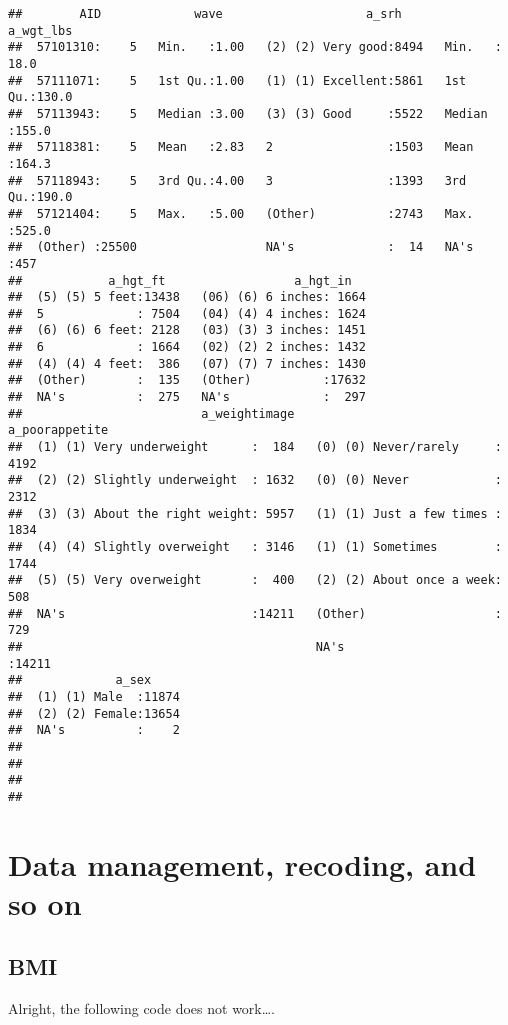 \documentclass[
]{book}
\begin{document}
\begin{verbatim}
##        AID             wave                    a_srh        a_wgt_lbs    
##  57101310:    5   Min.   :1.00   (2) (2) Very good:8494   Min.   : 18.0  
##  57111071:    5   1st Qu.:1.00   (1) (1) Excellent:5861   1st Qu.:130.0  
##  57113943:    5   Median :3.00   (3) (3) Good     :5522   Median :155.0  
##  57118381:    5   Mean   :2.83   2                :1503   Mean   :164.3  
##  57118943:    5   3rd Qu.:4.00   3                :1393   3rd Qu.:190.0  
##  57121404:    5   Max.   :5.00   (Other)          :2743   Max.   :525.0  
##  (Other) :25500                  NA's             :  14   NA's   :457    
##            a_hgt_ft                  a_hgt_in    
##  (5) (5) 5 feet:13438   (06) (6) 6 inches: 1664  
##  5             : 7504   (04) (4) 4 inches: 1624  
##  (6) (6) 6 feet: 2128   (03) (3) 3 inches: 1451  
##  6             : 1664   (02) (2) 2 inches: 1432  
##  (4) (4) 4 feet:  386   (07) (7) 7 inches: 1430  
##  (Other)       :  135   (Other)          :17632  
##  NA's          :  275   NA's             :  297  
##                         a_weightimage                     a_poorappetite 
##  (1) (1) Very underweight      :  184   (0) (0) Never/rarely     : 4192  
##  (2) (2) Slightly underweight  : 1632   (0) (0) Never            : 2312  
##  (3) (3) About the right weight: 5957   (1) (1) Just a few times : 1834  
##  (4) (4) Slightly overweight   : 3146   (1) (1) Sometimes        : 1744  
##  (5) (5) Very overweight       :  400   (2) (2) About once a week:  508  
##  NA's                          :14211   (Other)                  :  729  
##                                         NA's                     :14211  
##             a_sex      
##  (1) (1) Male  :11874  
##  (2) (2) Female:13654  
##  NA's          :    2  
##                        
##                        
##                        
## 
\end{verbatim}

\hypertarget{data-management-recoding-and-so-on}{%
\section{Data management, recoding, and so on}\label{data-management-recoding-and-so-on}}

\hypertarget{bmi}{%
\subsection{BMI}\label{bmi}}

Alright, the following code does not work\ldots.
\end{document}
